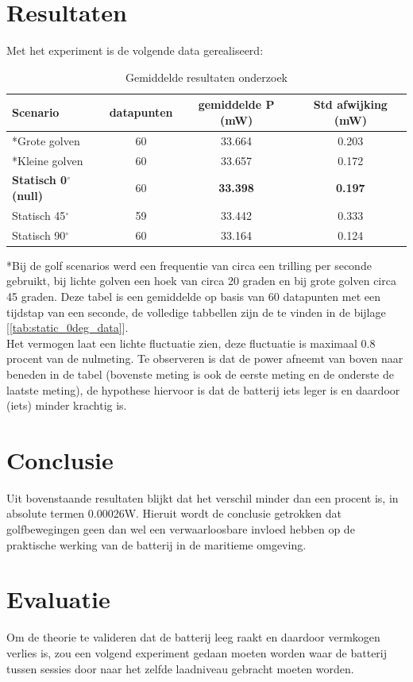 \section{Resultaten}
Met het experiment is de volgende data gerealiseerd:

\begin{table}[htbp]
\centering
\caption{Gemiddelde resultaten onderzoek }
\label{tab:experimental_results}
\begin{tabular}{l c S[table-format=2.3] S[table-format=1.3]}
\toprule
\textbf{Scenario} & \textbf{datapunten} & {\textbf{gemiddelde P (mW)}} & {\textbf{Std afwijking (mW)}} \\
\midrule
*Grote golven      & 60          & 33.664                 & 0.203                     \\
*Kleine golven     & 60          & 33.657                 & 0.172                     \\
\textbf{Statisch 0$^\circ$ (null)} & 60 & \textbf{33.398}     & \textbf{0.197}            \\
Statisch 45$^\circ$ & 59          & 33.442                 & 0.333                     \\
Statisch 90$^\circ$ & 60          & 33.164                 & 0.124                     \\
\bottomrule
\end{tabular}
\end{table}
*Bij de golf scenarios werd een frequentie van circa een trilling per seconde gebruikt, bij lichte golven een hoek van circa 20 graden en bij grote golven circa 45 graden.
\noindent
Deze tabel is een gemiddelde op basis van 60 datapunten met een tijdstap van een seconde, de volledige tabbellen zijn de te vinden in de bijlage [\ref{tab:static_0deg_data}].\\

\noindent
Het vermogen laat een lichte fluctuatie zien, deze fluctuatie is maximaal 0.8 procent van de nulmeting. Te observeren is dat de power afneemt van boven naar beneden in de tabel (bovenste meting is ook de eerste meting en de onderste de laatste meting), de hypothese hiervoor is dat de batterij iets leger is en daardoor (iets) minder krachtig is. 

\section{Conclusie}
Uit bovenstaande resultaten blijkt dat het verschil minder dan een procent is, in absolute termen 0.00026W. Hieruit wordt de conclusie getrokken dat golfbewegingen geen dan wel een verwaarloosbare invloed hebben op de praktische werking van de
batterij in de maritieme omgeving.

\section{Evaluatie}
Om de theorie te valideren dat de batterij leeg raakt en daardoor vermkogen verlies is, zou een volgend experiment gedaan moeten worden waar de batterij tussen sessies door naar het zelfde laadniveau gebracht moeten worden.